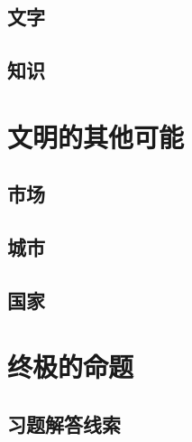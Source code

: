 \documentclass[a4paper,10.5pt]{book}
\begin{document}
\section{文字}

\section{知识}



\chapter{文明的其他可能}

\section{市场}

\section{城市}

\section{国家}



\chapter{终极的命题}



\begin{appendices}
\chapter{习题解答线索}



\end{appendices}
\end{document}
